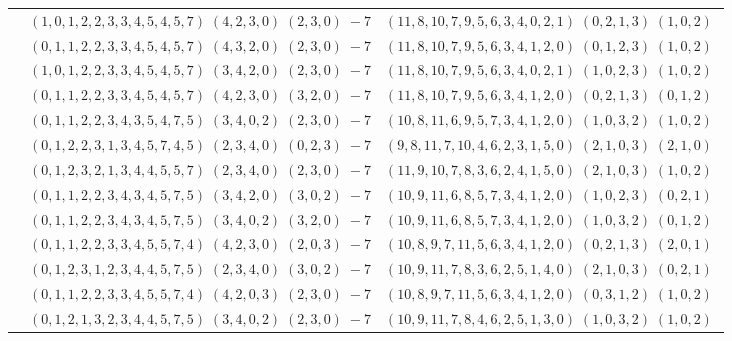 \documentclass[11pt]{article}
\begin{document}
\begin{longtable}[l]{|c|c|c|}
 \cline{2-3} 
 & $(1 ,0 ,1 ,2 ,2 ,3 ,3 ,4 ,5 ,4 ,5 ,7) \;(4 ,2 ,3 ,0) \;(2 ,3 ,0) \;-7$ & $(11 ,8 ,10 ,7 ,9 ,5 ,6 ,3 ,4 ,0 ,2 ,1) \;(0 ,2 ,1 ,3) \;(1 ,0 ,2) \;$\\ 
 \cline{2-3} 
 & $(0 ,1 ,1 ,2 ,2 ,3 ,3 ,4 ,5 ,4 ,5 ,7) \;(4 ,3 ,2 ,0) \;(2 ,3 ,0) \;-7$ & $(11 ,8 ,10 ,7 ,9 ,5 ,6 ,3 ,4 ,1 ,2 ,0) \;(0 ,1 ,2 ,3) \;(1 ,0 ,2) \;$\\ 
 \cline{2-3} 
 & $(1 ,0 ,1 ,2 ,2 ,3 ,3 ,4 ,5 ,4 ,5 ,7) \;(3 ,4 ,2 ,0) \;(2 ,3 ,0) \;-7$ & $(11 ,8 ,10 ,7 ,9 ,5 ,6 ,3 ,4 ,0 ,2 ,1) \;(1 ,0 ,2 ,3) \;(1 ,0 ,2) \;$\\ 
 \cline{2-3} 
 & $(0 ,1 ,1 ,2 ,2 ,3 ,3 ,4 ,5 ,4 ,5 ,7) \;(4 ,2 ,3 ,0) \;(3 ,2 ,0) \;-7$ & $(11 ,8 ,10 ,7 ,9 ,5 ,6 ,3 ,4 ,1 ,2 ,0) \;(0 ,2 ,1 ,3) \;(0 ,1 ,2) \;$\\ 
 \cline{2-3} 
 & $(0 ,1 ,1 ,2 ,2 ,3 ,4 ,3 ,5 ,4 ,7 ,5) \;(3 ,4 ,0 ,2) \;(2 ,3 ,0) \;-7$ & $(10 ,8 ,11 ,6 ,9 ,5 ,7 ,3 ,4 ,1 ,2 ,0) \;(1 ,0 ,3 ,2) \;(1 ,0 ,2) \;$\\ 
 \cline{2-3} 
 & $(0 ,1 ,2 ,2 ,3 ,1 ,3 ,4 ,5 ,7 ,4 ,5) \;(2 ,3 ,4 ,0) \;(0 ,2 ,3) \;-7$ & $(9 ,8 ,11 ,7 ,10 ,4 ,6 ,2 ,3 ,1 ,5 ,0) \;(2 ,1 ,0 ,3) \;(2 ,1 ,0) \;$\\ 
 \cline{2-3} 
 & $(0 ,1 ,2 ,3 ,2 ,1 ,3 ,4 ,4 ,5 ,5 ,7) \;(2 ,3 ,4 ,0) \;(2 ,3 ,0) \;-7$ & $(11 ,9 ,10 ,7 ,8 ,3 ,6 ,2 ,4 ,1 ,5 ,0) \;(2 ,1 ,0 ,3) \;(1 ,0 ,2) \;$\\ 
 \cline{2-3} 
 & $(0 ,1 ,1 ,2 ,2 ,3 ,4 ,3 ,4 ,5 ,7 ,5) \;(3 ,4 ,2 ,0) \;(3 ,0 ,2) \;-7$ & $(10 ,9 ,11 ,6 ,8 ,5 ,7 ,3 ,4 ,1 ,2 ,0) \;(1 ,0 ,2 ,3) \;(0 ,2 ,1) \;$\\ 
 \cline{2-3} 
 & $(0 ,1 ,1 ,2 ,2 ,3 ,4 ,3 ,4 ,5 ,7 ,5) \;(3 ,4 ,0 ,2) \;(3 ,2 ,0) \;-7$ & $(10 ,9 ,11 ,6 ,8 ,5 ,7 ,3 ,4 ,1 ,2 ,0) \;(1 ,0 ,3 ,2) \;(0 ,1 ,2) \;$\\ 
 \cline{2-3} 
 & $(0 ,1 ,1 ,2 ,2 ,3 ,3 ,4 ,5 ,5 ,7 ,4) \;(4 ,2 ,3 ,0) \;(2 ,0 ,3) \;-7$ & $(10 ,8 ,9 ,7 ,11 ,5 ,6 ,3 ,4 ,1 ,2 ,0) \;(0 ,2 ,1 ,3) \;(2 ,0 ,1) \;$\\ 
 \cline{2-3} 
 & $(0 ,1 ,2 ,3 ,1 ,2 ,3 ,4 ,4 ,5 ,7 ,5) \;(2 ,3 ,4 ,0) \;(3 ,0 ,2) \;-7$ & $(10 ,9 ,11 ,7 ,8 ,3 ,6 ,2 ,5 ,1 ,4 ,0) \;(2 ,1 ,0 ,3) \;(0 ,2 ,1) \;$\\ 
 \cline{2-3} 
 & $(0 ,1 ,1 ,2 ,2 ,3 ,3 ,4 ,5 ,5 ,7 ,4) \;(4 ,2 ,0 ,3) \;(2 ,3 ,0) \;-7$ & $(10 ,8 ,9 ,7 ,11 ,5 ,6 ,3 ,4 ,1 ,2 ,0) \;(0 ,3 ,1 ,2) \;(1 ,0 ,2) \;$\\ 
 \cline{2-3} 
 & $(0 ,1 ,2 ,1 ,3 ,2 ,3 ,4 ,4 ,5 ,7 ,5) \;(3 ,4 ,0 ,2) \;(2 ,3 ,0) \;-7$ & $(10 ,9 ,11 ,7 ,8 ,4 ,6 ,2 ,5 ,1 ,3 ,0) \;(1 ,0 ,3 ,2) \;(1 ,0 ,2) \;$\\ 

\end{longtable}
\end{document}
